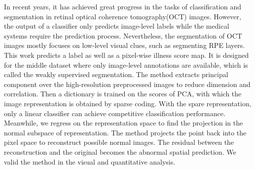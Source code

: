 
\begin{eabstract}
    In recent years, it has achieved great progress in the tasks of classification and segmentation in retinal optical coherence tomography(OCT) images. However, the output of a classifier only predicts image-level labels while the medical systems require the prediction process. Nevertheless, the segmentation of OCT images mostly focuses on low-level visual clues, such as segmenting RPE layers. This work predicts a label as well as a pixel-wise illness score map. It is designed for the middle dataset where only image-level annotations are available, which is called the weakly supervised segmentation. The method extracts principal component over the high-resolution preprocessed images to reduce dimension and correlation.  Then a dictionary is trained on the scores of PCA,  with which the image representation is obtained by sparse coding. With the spare representation, only a linear classifier can achieve competitive classification performance. Meanwhile, we regress on the representation space to find the projection in the normal subspace of representation. The method projects the point back into the pixel space to reconstruct possible normal images. The residual between the reconstruction and the original becomes the abnormal spatial prediction. We valid the method in the visual and quantitative analysis.


\end{eabstract}

